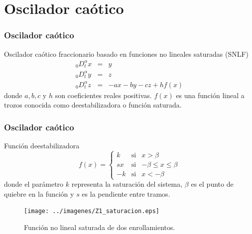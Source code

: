 \documentclass[10pt]{beamer}
\begin{document}
	\section{Oscilador caótico}
	\begin{frame}
		\frametitle{Oscilador caótico}
		\begin{block}{Oscilador caótico fraccionario basado en funciones no lineales saturadas (SNLF)}
			\begin{equation}
		 \begin{array}{lcl}
		_{0}D_{t}^{\alpha}x & = & y \\
		_{0}D_{t}^{\alpha}y  & = & z\\
		_{0}D_{t}^{\alpha}z  & = & -ax - by -cz + hf(x)
		\end{array}
		\label{ec:frac_osc_imp}
	\end{equation}
	donde  $a, b, c$ y $h$ son coeficientes reales positivas. $f(x)$ es una función lineal a trozos conocida como deestabilizadora o función saturada.
		\end{block}
	\end{frame}
	\begin{frame}
		\frametitle{Oscilador caótico}
		\begin{block}{Función deestabilizadora}
			 \begin{equation}
		f(x) = \left\{ \begin{array}{lcl}
		k & \mathrm{si} & x > \beta \\
		sx & \mathrm{si} & - \beta \leq x \leq \beta  \\
		-k & \mathrm{si} & x < -\beta
		\end{array}
		\right.
		\label{ec:saturacion}
	\end{equation}
	donde el parámetro $k$ representa la saturación del sistema, $\beta$ es el punto de quiebre en la función y $s$ es la pendiente entre tramos.
		\begin{figure}[!ht]
		\caption{Función no lineal saturada de dos enrollamientos.} 
		\label{fig:Z1_saturacion}
		\centering
		\texttt{[image: ../imagenes/Z1\_saturacion.eps]}
	\end{figure}	
		\end{block}
	\end{frame}
\end{document}
